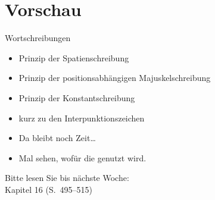 \section{Vorschau}

\begin{frame}
  {Wortschreibungen}
  \pause
  \begin{itemize}[<+->]
    \item Prinzip der Spatienschreibung
    \item Prinzip der positionsabhängigen Majuskelschreibung
    \item Prinzip der \alert{Konstantschreibung}
      \Halbzeile
    \item kurz zu den Interpunktionszeichen
      \Halbzeile
    \item Da bleibt noch Zeit\ldots
    \item Mal sehen, wofür die genutzt wird.
  \end{itemize}
  \pause
  \Halbzeile
  \begin{center}
    Bitte lesen Sie bis nächste Woche:\\
    \alert{Kapitel 16 (S.~495--515)}
  \end{center}
  \pause
  \pause
  \pause
  \pause
  \pause
\end{frame}

